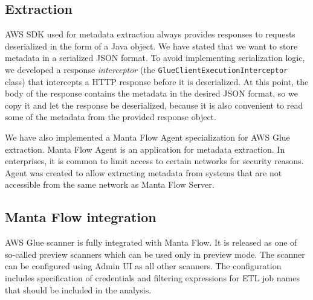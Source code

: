 \subsection{Extraction}
AWS SDK used for metadata extraction always provides responses to requests deserialized in the form of a Java object. We have stated that we want to store metadata in a serialized JSON format. To avoid implementing serialization logic, we developed a response \textit{interceptor} (the \texttt{GlueClientExecutionInterceptor} class) that intercepts a HTTP response before it is deserialized. At this point, the body of the response contains the metadata in the desired JSON format, so we copy it and let the response be deserialized, because it is also convenient to read some of the metadata from the provided response object.
\par
We have also implemented a Manta Flow Agent specialization for AWS Glue extraction. Manta Flow Agent is an application for metadata extraction. In enterprises, it is common to limit access to certain networks for security reasons. Agent was created to allow extracting metadata from systems that are not accessible from the same network as Manta Flow Server.

\subsection{Manta Flow integration}
AWS Glue scanner is fully integrated with Manta Flow. It is released as one of so-called preview scanners which can be used only in preview mode. The scanner can be configured using Admin UI as all other scanners. The configuration includes specification of credentials and filtering expressions for ETL job names that should be included in the analysis.

